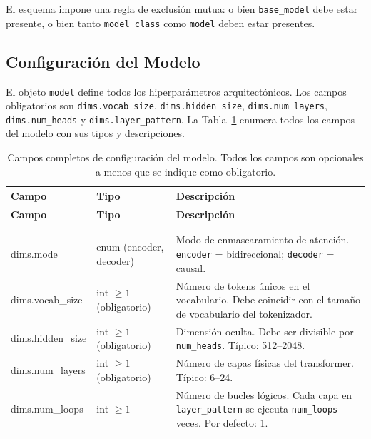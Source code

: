 El esquema impone una regla de exclusión mutua: o bien \texttt{base\_model} debe estar presente, o bien tanto \texttt{model\_class} como \texttt{model} deben estar presentes.

\subsection{Configuración del Modelo}
\label{subsec:model-config}

El objeto \texttt{model} define todos los hiperparámetros arquitectónicos. Los campos obligatorios son \texttt{dims.vocab\_size}, \texttt{dims.hidden\_size}, \texttt{dims.num\_layers}, \texttt{dims.num\_heads} y \texttt{dims.layer\_pattern}. La Tabla~\ref{tab:model-fields} enumera todos los campos del modelo con sus tipos y descripciones.

\begin{longtable}{>{\ttfamily\footnotesize\raggedright\arraybackslash}p{5.6cm}>{\raggedright\arraybackslash}p{2.4cm}>{\raggedright\arraybackslash}p{6.9cm}}
\toprule
\textbf{Campo} & \textbf{Tipo} & \textbf{Descripción} \\
\midrule
\endfirsthead
\toprule
\textbf{Campo} & \textbf{Tipo} & \textbf{Descripción} \\
\midrule
\endhead
\midrule
\multicolumn{3}{r}{\textit{continúa en la página siguiente}} \\
\endfoot
\bottomrule
\caption{Campos completos de configuración del modelo. Todos los campos son opcionales a menos que se indique como obligatorio.}
\label{tab:model-fields}
\endlastfoot
\midrule
\multicolumn{3}{l}{\textit{model.dims.*}} \\
\midrule
dims.mode & enum (encoder, decoder) & Modo de enmascaramiento de atención. \texttt{encoder} = bidireccional; \texttt{decoder} = causal. \\
dims.vocab\_size & int $\ge 1$ (obligatorio) & Número de tokens únicos en el vocabulario. Debe coincidir con el tamaño de vocabulario del tokenizador. \\
dims.hidden\_size & int $\ge 1$ (obligatorio) & Dimensión oculta. Debe ser divisible por \texttt{num\_heads}. Típico: 512--2048. \\
dims.num\_layers & int $\ge 1$ (obligatorio) & Número de capas físicas del transformer. Típico: 6--24. \\
dims.num\_loops & int $\ge 1$ & Número de bucles lógicos. Cada capa en \texttt{layer\_pattern} se ejecuta \texttt{num\_loops} veces. Por defecto: 1. \\

\end{longtable}
